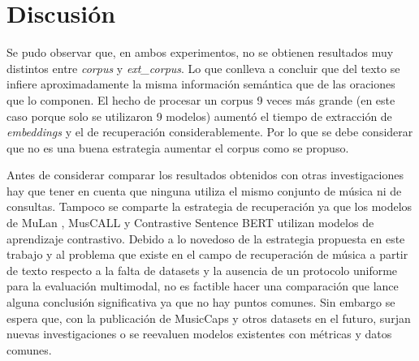 \section{Discusión}
\label{sec:final-discution}
Se pudo observar que, en ambos experimentos, no se obtienen resultados muy distintos entre \textit{corpus} y \textit{ext\_corpus}. Lo que conlleva a concluir que del texto se infiere aproximadamente la misma información semántica que de las oraciones que lo componen. El hecho de procesar un corpus 9 veces más grande (en este caso porque solo se utilizaron 9 modelos) aumentó el tiempo de extracción de \textit{embeddings} y el de recuperación considerablemente. Por lo que se debe considerar que no es una buena estrategia aumentar el corpus como se propuso. 

Antes de considerar comparar los resultados obtenidos con otras investigaciones hay que tener en cuenta que ninguna utiliza el mismo conjunto de música ni de consultas. Tampoco se comparte la estrategia de recuperación ya que los modelos de MuLan \cite{Huang2022MuLanAJ}, MusCALL \cite{Manco2022ContrastiveAL} y Contrastive Sentence BERT \cite{Doh2022TowardUT} utilizan modelos de aprendizaje contrastivo. Debido a lo novedoso de la estrategia propuesta en este trabajo y al problema que existe en el campo de recuperación de música a partir de texto respecto a la falta de datasets y la ausencia de un protocolo uniforme para la evaluación multimodal, no es factible hacer una comparación que lance alguna conclusión significativa ya que no hay puntos comunes. Sin embargo se espera que, con la publicación de MusicCaps \cite{Agostinelli2023MusicLMGM} y otros datasets en el futuro, surjan nuevas investigaciones o se reevaluen modelos existentes con métricas y datos comunes. 
